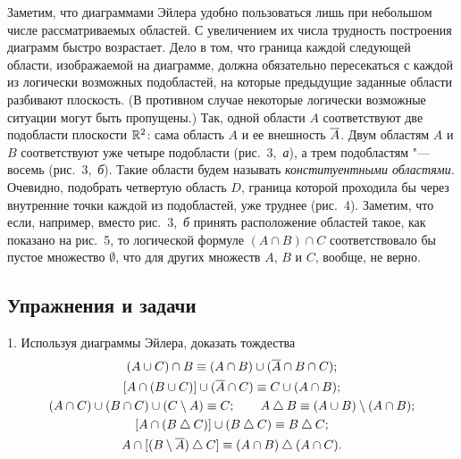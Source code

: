 Заметим, что диаграммами Эйлера удобно пользоваться лишь при небольшом
числе рассматриваемых областей. С увеличением их числа трудность построения
диаграмм быстро возрастает. Дело в том, что граница каждой следующей
области, изображаемой на диаграмме, должна обязательно пересекаться
с каждой из логически возможных подобластей, на которые предыдущие заданные
области разбивают плоскость. (В противном случае некоторые логически
возможные ситуации могут быть пропущены.) Так, одной области $A$
соответствуют две подобласти плоскости $\mathbb R^2$: сама область $A$ и ее
внешность $\overline{A}$. Двум областям $A$ и $B$ соответствуют уже четыре
подобласти (рис.~3,~\emph{а}), а трем подобластям "--- восемь
(рис.~3,~\emph{б}). Такие области будем называть \emph{конституентными
областями}. Очевидно, подобрать четвертую область $D$, граница которой
проходила бы через внутренние точки каждой из подобластей, уже труднее
(рис.~4). Заметим, что если, например, вместо рис.~3,~\emph{б} принять
расположение областей такое, как показано на рис.~5, то логической формуле
$(A\cap B)\cap C$ соответствовало бы пустое множество $\emptyset$, что для
других множеств $A$, $B$ и $C$, вообще, не верно.

\begin{figure}[h]
\centering
{}
\end{figure}

\subsection*{Упражнения и задачи}
1. Используя диаграммы Эйлера, доказать тождества
\[
\begin{gathered}
(A\cup C)\cap B\equiv(A\cap B)\cup(\ov A\cap B\cap C);\\
[A\cap(B\cup C)]\cup(\ov A\cap C)\equiv C\cup(A\cap B);\\
(A\cap C)\cup(B\cap C)\cup(C\setminus A)\equiv C;\qquad A\sd B\equiv(A\cup B)\setminus(A\cap B);\\
[A\cap(B\sd C)]\cup(B\sd C)\equiv B\sd C;\\
A\cap[(B\setminus\ov A)\sd C]\equiv(A\cap B)\sd(A\cap C).
\end{gathered}
\]


